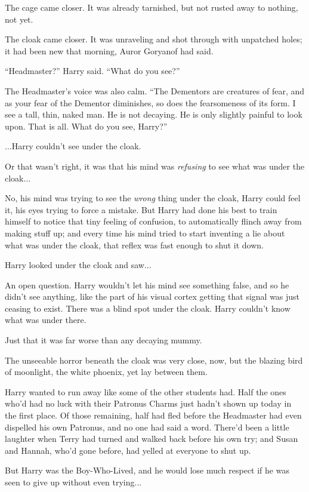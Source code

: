 The cage came closer. It was already tarnished, but not rusted away to nothing, not yet.

The cloak came closer. It was unraveling and shot through with unpatched holes; it had been new that morning, Auror Goryanof had said.

``Headmaster?'' Harry said. ``What do you see?''

The Headmaster's voice was also calm. ``The Dementors are creatures of fear, and as your fear of the Dementor diminishes, so does the fearsomeness of its form. I see a tall, thin, naked man. He is not decaying. He is only slightly painful to look upon. That is all. What do you see, Harry?''

...Harry couldn't see under the cloak.

Or that wasn't right, it was that his mind was \emph{refusing} to see what was under the cloak...

No, his mind was trying to see the \emph{wrong} thing under the cloak, Harry could feel it, his eyes trying to force a mistake. But Harry had done his best to train himself to notice that tiny feeling of confusion, to automatically flinch away from making stuff up; and every time his mind tried to start inventing a lie about what was under the cloak, that reflex was fast enough to shut it down.

Harry looked under the cloak and saw...

An open question. Harry wouldn't let his mind see something false, and so he didn't see anything, like the part of his visual cortex getting that signal was just ceasing to exist. There was a blind spot under the cloak. Harry couldn't know what was under there.

Just that it was far worse than any decaying mummy.

The unseeable horror beneath the cloak was very close, now, but the blazing bird of moonlight, the white phoenix, yet lay between them.

Harry wanted to run away like some of the other students had. Half the ones who'd had no luck with their Patronus Charms just hadn't shown up today in the first place. Of those remaining, half had fled before the Headmaster had even dispelled his own Patronus, and no one had said a word. There'd been a little laughter when Terry had turned and walked back before his own try; and Susan and Hannah, who'd gone before, had yelled at everyone to shut up.

But Harry was the Boy-Who-Lived, and he would lose much respect if he was seen to give up without even trying...

